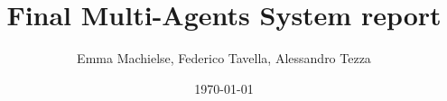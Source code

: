 \documentclass[a4paper]{article}
\title{Final Multi-Agents System report}
\author{Emma Machielse, Federico Tavella, Alessandro Tezza}
\date{\today}
\begin{document}
\maketitle



















\newpage
\onecolumn



\end{document}
